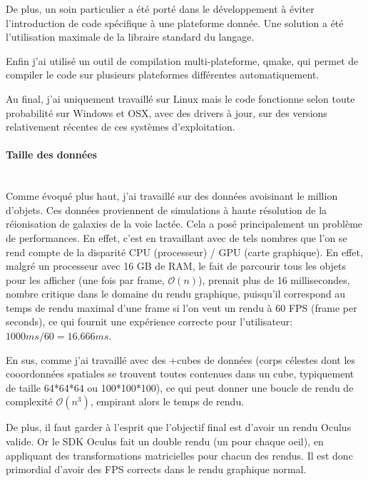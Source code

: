 \documentclass[a4paper,french,12pt]{article}
\begin{document}
		  De plus, un soin particulier a été porté dans le développement à éviter l'introduction 
		  de code spécifique à une plateforme donnée. Une solution a été l'utilisation maximale de la libraire 
		  standard du langage.
		  
		  Enfin j'ai utilisé un outil de compilation multi-plateforme, qmake, qui permet de compiler le code
		  sur plusieurs plateformes différentes automatiquement.
		  
		  Au final, j'ai uniquement travaillé sur Linux mais le code fonctionne selon toute probabilité sur 
		  Windows et OSX, avec des drivers à jour, sur des versions relativement récentes de ces systèmes d'exploitation.
		  
		\paragraph{Taille des données} ~\\
		
		  Comme évoqué plus haut, j'ai travaillé sur des données avoisinant le million d'objets.
		  Ces données proviennent de simulations à haute résolution de la réionisation de galaxies de la voie lactée.
		  Cela a posé
		  principalement un problème de performances. En effet, c'est en travaillant avec de tels nombres que
		  l'on se rend compte de la disparité CPU (processeur) / GPU (carte graphique).
		  En effet, malgré un processeur avec 16 GB de RAM, le fait de parcourir tous les objets pour les afficher (une fois par frame, $\mathcal{O}(n)$),
		  prenait plus de 16 millisecondes, nombre critique dans le domaine du rendu graphique, puisqu'il
		  correspond au temps de rendu maximal d'une frame si l'on veut un rendu à 60 FPS (frame per seconds),
		  ce qui fournit une expérience correcte pour l'utilisateur: $1000 ms / 60 = 16.666 ms$.
		  
		  En sus, comme j'ai travaillé avec des +cubes de données (corps célestes dont les cooordonnées spatiales se trouvent toutes
		  contenues dans un cube, typiquement de taille 64*64*64 ou 100*100*100), ce qui peut donner une boucle de rendu
		  de complexité $\mathcal{O}(n^3)$, empirant alors le temps de rendu.
		  
		  De plus, il faut garder à l'esprit que l'objectif final est d'avoir un rendu Oculus valide. Or le
		  SDK Oculus fait un double rendu (un pour chaque oeil), en appliquant des transformations matricielles
		  pour chacun des rendus. Il est donc primordial d'avoir des FPS corrects dans le rendu graphique normal.
		  
\end{document}
